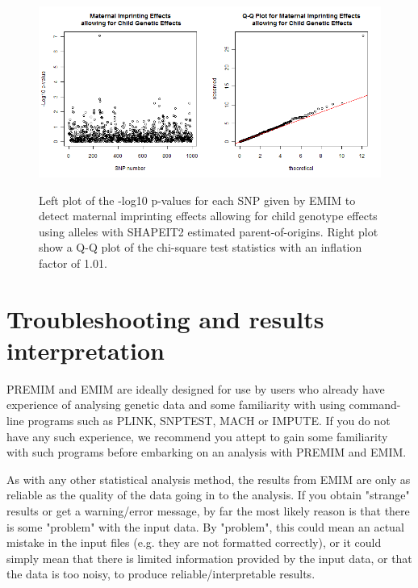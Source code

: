 \documentclass[a4paper,12pt]{article}
\begin{document}
{\begin{figure}[ht]
{\begin{center}
{\includegraphics[width=400pt]{pooExampleDataImR.png}}
\caption{Left plot of the -log10 p-values for each SNP given by EMIM to detect maternal imprinting effects allowing for child genotype effects using alleles with SHAPEIT2 estimated parent-of-origins. Right plot show a Q-Q plot of the chi-square test statistics with an inflation factor of 1.01.}
\label{poo-imr-fig}
\end{center}}
\end{figure}
}






\section{Troubleshooting and results interpretation}
\label{trouble}

PREMIM and EMIM are ideally designed for use by users who already have experience of analysing genetic data and some familiarity with using command-line programs such as PLINK, SNPTEST, MACH or IMPUTE. If you do not have any such experience, we recommend you attept to gain some familiarity with such programs before embarking on an analysis with PREMIM and EMIM. 

As with any other statistical analysis method, the results from EMIM are only as reliable as the quality of the data going in to the analysis. If you obtain "strange" results or get a warning/error message, by far the most likely reason is that there is some "problem" with the input data. By "problem", this could mean an actual mistake in the input files (e.g. they are not formatted correctly), or it could simply mean that there is limited information provided by the input data, or that the data is too noisy, to produce reliable/interpretable results. 
\end{document}
